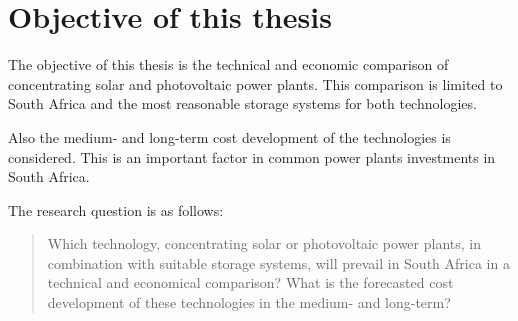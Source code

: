 \section{Objective of this thesis}

%

The objective of this thesis is the technical and economic comparison of concentrating solar and photovoltaic power plants. This comparison is limited to South Africa and the most reasonable storage systems for both technologies.


Also the medium- and long-term cost development of the technologies is considered. This is an important factor in common power plants investments in South Africa.

The research question is as follows:
\begin{quote}
Which technology, concentrating solar or photovoltaic power plants, in combination with suitable storage systems, will prevail in South Africa in a technical and economical comparison? What is the forecasted cost development of these technologies in the medium- and long-term?
\end{quote}

